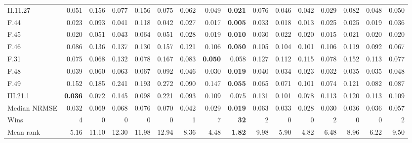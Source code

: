 \begin{table}[!htbp]
\begin{tabular}{lrrrrrrrrrrrrrrr}
II.11.27 & 0.051 & 0.156 & 0.077 & 0.156 & 0.075 & 0.062 & 0.049 & \textbf{0.021} & 0.076 & 0.046 & 0.042 & 0.029 & 0.082 & 0.048 & 0.050 \\
F.44 & 0.023 & 0.093 & 0.041 & 0.118 & 0.042 & 0.027 & 0.017 & \textbf{0.005} & 0.033 & 0.018 & 0.013 & 0.025 & 0.025 & 0.019 & 0.036 \\
F.45 & 0.020 & 0.051 & 0.043 & 0.064 & 0.051 & 0.028 & 0.019 & \textbf{0.010} & 0.030 & 0.022 & 0.020 & 0.015 & 0.021 & 0.020 & 0.020 \\
F.46 & 0.086 & 0.136 & 0.137 & 0.130 & 0.157 & 0.121 & 0.106 & \textbf{0.050} & 0.105 & 0.104 & 0.101 & 0.106 & 0.119 & 0.092 & 0.067 \\
F.31 & 0.075 & 0.068 & 0.132 & 0.078 & 0.167 & 0.083 & \textbf{0.050} & 0.058 & 0.127 & 0.112 & 0.115 & 0.078 & 0.152 & 0.113 & 0.077 \\
F.48 & 0.039 & 0.060 & 0.063 & 0.067 & 0.092 & 0.046 & 0.030 & \textbf{0.019} & 0.040 & 0.034 & 0.023 & 0.032 & 0.035 & 0.035 & 0.048 \\
F.49 & 0.152 & 0.185 & 0.241 & 0.193 & 0.272 & 0.090 & 0.147 & \textbf{0.055} & 0.065 & 0.071 & 0.101 & 0.074 & 0.121 & 0.082 & 0.087 \\
III.21.1 & \textbf{0.036} & 0.072 & 0.145 & 0.098 & 0.221 & 0.093 & 0.109 & 0.075 & 0.131 & 0.101 & 0.078 & 0.113 & 0.120 & 0.113 & 0.109 \\
\midrule
Median NRMSE & 0.032 & 0.069 & 0.068 & 0.076 & 0.070 & 0.042 & 0.029 & \textbf{0.019} & 0.063 & 0.033 & 0.028 & 0.030 & 0.036 & 0.036 & 0.057 \\
Wins & 4 & 0 & 0 & 0 & 0 & 1 & 7 & \textbf{32} & 2 & 0 & 0 & 2 & 0 & 0 & 2 \\
Mean rank & 5.16 & 11.10 & 12.30 & 11.98 & 12.94 & 8.36 & 4.48 & \textbf{1.82} & 9.98 & 5.90 & 4.82 & 6.48 & 8.96 & 6.22 & 9.50 \\
\bottomrule\end{tabular}
\end{table}
